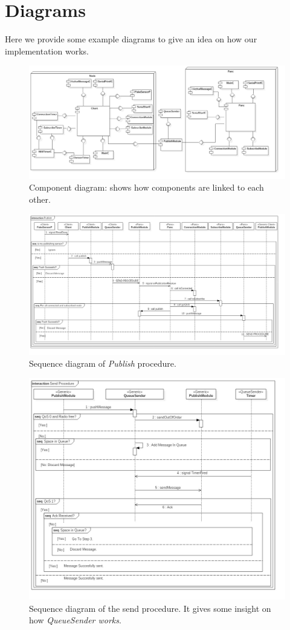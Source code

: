 \documentclass[10pt]{article}
\begin{document}
\section{Diagrams}
Here we provide some example diagrams to give an idea on how our implementation works.
\begin{figure}[h]
\caption{Component diagram: shows how components are linked to each other.}
\centering
\includegraphics[scale=0.3]{ComponentDiagram}
\end{figure}
\begin{figure}[h]
\caption{Sequence diagram of \emph{Publish} procedure.}
\centering
\includegraphics[scale=0.3]{Publish}
\end{figure}
\begin{figure}[h]
\caption{Sequence diagram of the send procedure. It gives some insight on how \emph{QueueSender works}.}
\centering
\includegraphics[scale=0.3]{SendProcedure}
\end{figure}
\end{document}
